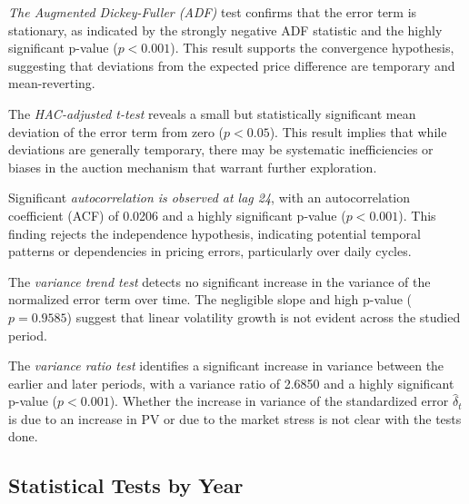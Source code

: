 \documentclass[12pt]{article}
\begin{document}
\textit{The Augmented Dickey-Fuller (ADF)} test confirms that the error term is stationary, as indicated by the strongly negative ADF statistic and the highly significant p-value ($p < 0.001$). This result supports the convergence hypothesis, suggesting that deviations from the expected price difference are temporary and mean-reverting.

The \textit{HAC-adjusted t-test} reveals a small but statistically significant mean deviation of the error term from zero ($p < 0.05$). This result implies that while deviations are generally temporary, there may be systematic inefficiencies or biases in the auction mechanism that warrant further exploration.

Significant \textit{autocorrelation is observed at lag 24}, with an autocorrelation coefficient (ACF) of 0.0206 and a highly significant p-value ($p < 0.001$). This finding rejects the independence hypothesis, indicating potential temporal patterns or dependencies in pricing errors, particularly over daily cycles.

The \textit{variance trend test} detects no significant increase in the variance of the normalized error term over time. The negligible slope and high p-value ($p = 0.9585$) suggest that linear volatility growth is not evident across the studied period.

The \textit{variance ratio test} identifies a significant increase in variance between the earlier and later periods, with a variance ratio of 2.6850 and a highly significant p-value ($p < 0.001$). Whether the increase in variance of the standardized error $\hat{\delta}_t$ is due to an increase in PV or due to the market stress is not clear with the tests done. 

\subsection{Statistical Tests by Year}
\end{document}

